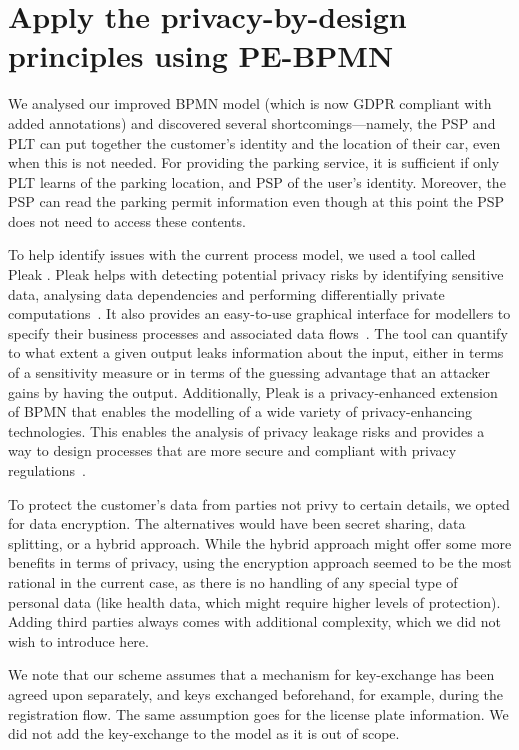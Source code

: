 \section{Apply the privacy-by-design principles using PE-BPMN}

We analysed our improved BPMN model (which is now GDPR compliant with added
annotations) and discovered several shortcomings---namely, the PSP and PLT can
put together the customer's identity and the location of their car, even when
this is not needed. For providing the parking service, it is sufficient if only
PLT learns of the parking location, and PSP of the user's identity. Moreover,
the PSP can read the parking permit information even though at this point the
PSP does not need to access these contents.

To help identify issues with the current process model, we used a tool called
Pleak \cite{pleaktool}. Pleak helps with detecting potential privacy risks by
identifying sensitive data, analysing data dependencies and performing
differentially private
computations~\cite[311-313]{10.1007/978-3-030-16722-6_18}. It also provides an
easy-to-use graphical interface for modellers to specify their business
processes and associated data flows~\cite{pleaktool}. The tool can quantify to
what extent a given output leaks information about the input, either in terms of
a sensitivity measure or in terms of the guessing advantage that an attacker
gains by having the output. Additionally, Pleak is a privacy-enhanced extension
of BPMN that enables the modelling of a wide variety of privacy-enhancing
technologies. This enables the analysis of privacy leakage risks and provides a
way to design processes that are more secure and compliant with privacy
regulations~\cite[1-3]{10.1007/s10009-021-00636-w}.

To protect the customer's data from parties not privy to certain details, we
opted for data encryption. The alternatives would have been secret sharing, data
splitting, or a hybrid approach. While the hybrid approach might offer some more
benefits in terms of privacy, using the encryption approach seemed to be the 
most rational in the current case, as there is no handling of any special type
of personal data (like health data, which might require higher levels of
protection). Adding third parties always comes with additional complexity, which
we did not wish to introduce here.

We note that our scheme assumes that a mechanism for key-exchange has been
agreed upon separately, and keys exchanged beforehand, for example, during the
registration flow. The same assumption goes for the license plate information.
We did not add the key-exchange to the model as it is out of scope.

